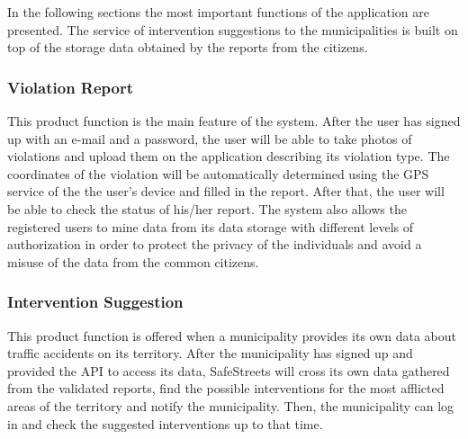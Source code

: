 In the following sections the most important functions of the application are presented. The service of intervention suggestions to the municipalities is built on top of the storage data obtained by the reports from the citizens.
\subsubsection{Violation Report}
This product function is the main feature of the system. After the user has signed up with an e-mail and a password, the user will be able to take photos of violations and upload them on the application describing its violation type. The coordinates of the violation will be automatically determined using the GPS service of the the user's device and filled in the report. After that, the user will be able to check the status of his/her report. The system also allows the registered users to mine data from its data storage with different levels of authorization in order to protect the privacy of the individuals and avoid a misuse of the data from the common citizens.
\subsubsection{Intervention Suggestion}
This product function is offered when a municipality provides its own data about traffic accidents on its territory. After the municipality has signed up and provided the API to access its data, SafeStreets will cross its own data gathered from the validated reports, find the possible interventions for the most afflicted areas of the territory and notify the municipality. Then, the municipality can log in and check the suggested interventions up to that time.